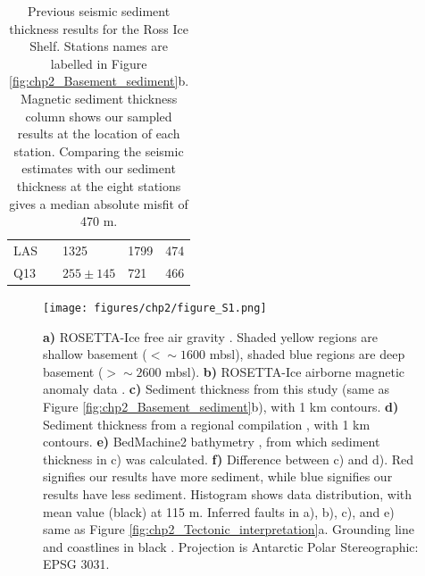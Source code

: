 \begin{table}[]
{\begin{tabular}{lllll}
LAS           & \citep{crarymarinesediment1961} & 1325                                                                               & 1799                                                                                & 474                                                                         \\
Q13           & \citep{greischaranalysis1992}   & $255\pm145$                                                                        & 721                                                                                 & 466                                                                        
\end{tabular}%
}
\caption[Previous Ross Ice Shelf seismic sediment thickness measurements]{Previous seismic sediment thickness results for the Ross Ice Shelf. Stations names are labelled in Figure \ref{fig:chp2_Basement_sediment}b. Magnetic sediment thickness column shows our sampled results at the location of each station. Comparing the seismic estimates with our sediment thickness at the eight stations gives a median absolute misfit of 470 m.}
\label{table:appA_S1}
\end{table}

\begin{figure}[!ht]
    \centering
    \texttt{[image: figures/chp2/figure\_S1.png]}
    \caption[Various Ross Ice Shelf grids]{\textbf{a)} ROSETTA-Ice free air gravity \citep{tintoross2019}. Shaded yellow regions are shallow basement ($<\sim1600$ mbsl), shaded blue regions are deep basement ($>\sim2600$ mbsl). \textbf{b)} ROSETTA-Ice airborne magnetic anomaly data \citep{tintoross2019}. \textbf{c)} Sediment thickness from this study (same as Figure \ref{fig:chp2_Basement_sediment}b), with 1 km contours. \textbf{d)} Sediment thickness from a regional compilation \citep[Section \ref{appA:text_S6},][]{lindequepreglacial2016, wilsonwest2009}, with 1 km contours. \textbf{e)} BedMachine2 bathymetry \citep{morlighemdeep2020}, from which sediment thickness in c) was calculated. \textbf{f)} Difference between c) and d). Red signifies our results have more sediment, while blue signifies our results have less sediment. Histogram shows data distribution, with mean value (black) at 115 m. Inferred faults in a), b), c), and e) same as Figure \ref{fig:chp2_Tectonic_interpretation}a. Grounding line and coastlines in black \citep{rignoticeshelf2013}. Projection is Antarctic Polar Stereographic: EPSG 3031.}
    \label{fig:appA_S1}
\end{figure}

